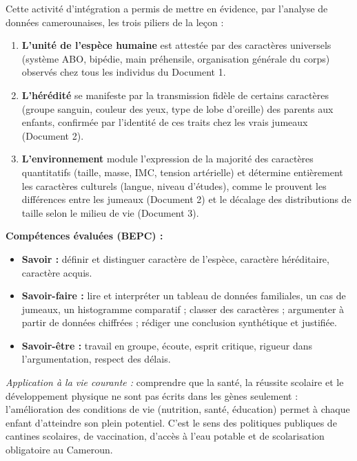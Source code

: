 \documentclass[11pt]{article}
\newcounter{popsec}
\newcounter{popsub}
\newcommand{\courssub}[1]{%
  \stepcounter{popsub}%
  \par\vspace{9pt}\noindent{\popxbold\fontsize{11.5}{13}\selectfont\color{popink}{\color{poporange}\thepopsec.\thepopsub}\hspace{6pt}#1}\par\nopagebreak\vspace{4pt}
}
\begin{document}
\courssub{Bilan de l'activité}
Cette activité d'intégration a permis de mettre en évidence, par l'analyse de données camerounaises, les trois piliers de la leçon :
\begin{enumerate}
    \item \textbf{L'unité de l'espèce humaine} est attestée par des caractères universels (système ABO, bipédie, main préhensile, organisation générale du corps) observés chez tous les individus du Document 1.
    \item \textbf{L'hérédité} se manifeste par la transmission fidèle de certains caractères (groupe sanguin, couleur des yeux, type de lobe d'oreille) des parents aux enfants, confirmée par l'identité de ces traits chez les vrais jumeaux (Document 2).
    \item \textbf{L'environnement} module l'expression de la majorité des caractères quantitatifs (taille, masse, IMC, tension artérielle) et détermine entièrement les caractères culturels (langue, niveau d'études), comme le prouvent les différences entre les jumeaux (Document 2) et le décalage des distributions de taille selon le milieu de vie (Document 3).
\end{enumerate}
\par
\textbf{Compétences évaluées (BEPC) :}
\begin{itemize}
    \item \textbf{Savoir :} définir et distinguer caractère de l'espèce, caractère héréditaire, caractère acquis.
    \item \textbf{Savoir-faire :} lire et interpréter un tableau de données familiales, un cas de jumeaux, un histogramme comparatif ; classer des caractères ; argumenter à partir de données chiffrées ; rédiger une conclusion synthétique et justifiée.
    \item \textbf{Savoir-être :} travail en groupe, écoute, esprit critique, rigueur dans l'argumentation, respect des délais.
\end{itemize}
\par
\emph{Application à la vie courante :} comprendre que la santé, la réussite scolaire et le développement physique ne sont pas \og écrits dans les gènes \fg{} seulement : l'amélioration des conditions de vie (nutrition, santé, éducation) permet à chaque enfant d'atteindre son plein potentiel. C'est le sens des politiques publiques de cantines scolaires, de vaccination, d'accès à l'eau potable et de scolarisation obligatoire au Cameroun.

\newpage
\end{document}
